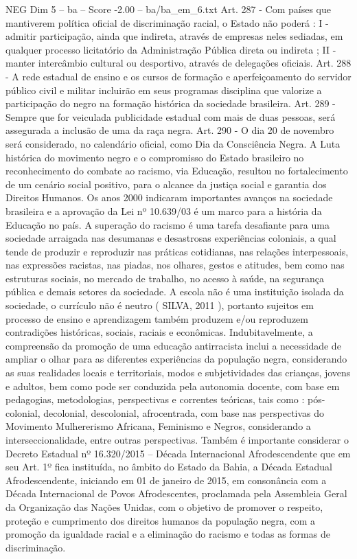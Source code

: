 \begin{textsample}{NEG Dim 5 – ba – Score -2.00 – ba/ba\_em\_6.txt}
Art. 287 - Com países que mantiverem política oficial de discriminação racial, o Estado não poderá : I - admitir participação, ainda que indireta, através de empresas neles sediadas, em qualquer processo licitatório da Administração Pública direta ou indireta ; II - manter intercâmbio cultural ou desportivo, através de delegações oficiais.
Art. 288 - A rede estadual de ensino e os cursos de formação e aperfeiçoamento do servidor público civil e militar incluirão em seus programas disciplina que valorize a participação do negro na formação histórica da sociedade brasileira.
Art. 289 - Sempre que for veiculada publicidade estadual com mais de duas pessoas, será assegurada a inclusão de uma da raça negra.
Art. 290 - O dia 20 de novembro será considerado, no calendário oficial, como Dia da Consciência Negra.
A Luta histórica do movimento negro e o compromisso do Estado brasileiro no reconhecimento do combate ao racismo, via Educação, resultou no fortalecimento de um cenário social positivo, para o alcance da justiça social e garantia dos Direitos Humanos.
Os anos 2000 indicaram importantes avanços na sociedade brasileira e a aprovação da Lei nº 10.639/03 é um marco para a história da Educação no país.
A superação do racismo é uma tarefa desafiante para uma sociedade arraigada nas desumanas e desastrosas experiências coloniais, a qual tende de produzir e reproduzir nas práticas cotidianas, nas relações interpessoais, nas expressões racistas, nas piadas, nos olhares, gestos e atitudes, bem como nas estruturas sociais, no mercado de trabalho, no acesso à saúde, na segurança pública e demais setores da sociedade.
A escola não é uma instituição isolada da sociedade, o currículo não é neutro ( SILVA, 2011 ), portanto sujeitos em processo de ensino e aprendizagem também produzem e/ou reproduzem contradições históricas, sociais, raciais e econômicas.
Indubitavelmente, a compreensão da promoção de uma educação antirracista inclui a necessidade de ampliar o olhar para as diferentes experiências da população negra, considerando as suas realidades locais e territoriais, modos e subjetividades das crianças, jovens e adultos, bem como pode ser conduzida pela autonomia docente, com base em pedagogias, metodologias, perspectivas e correntes teóricas, tais como : pós-colonial, decolonial, descolonial, afrocentrada, com base nas perspectivas do Movimento Mulhererismo Africana, Feminismo e Negros, considerando a interseccionalidade, entre outras perspectivas.
Também é importante considerar o Decreto Estadual nº 16.320/2015 – Década Internacional Afrodescendente que em seu Art. 1º fica instituída, no âmbito do Estado da Bahia, a Década Estadual Afrodescendente, iniciando em 01 de janeiro de 2015, em consonância com a Década Internacional de Povos Afrodescentes, proclamada pela Assembleia Geral da Organização das Nações Unidas, com o objetivo de promover o respeito, proteção e cumprimento dos direitos humanos da população negra, com a promoção da igualdade racial e a eliminação do racismo e todas as formas de discriminação.

\end{textsample}
